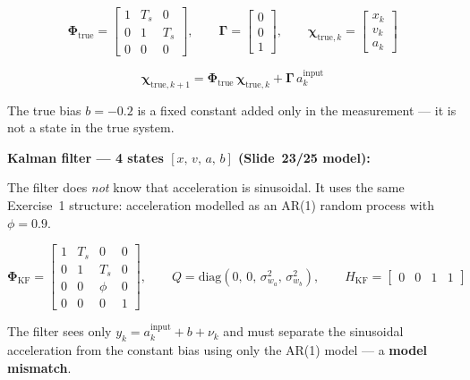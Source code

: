 \documentclass[12pt, a4paper]{article}
\begin{document}
\[
\boldsymbol{\Phi}_{\text{true}} =
\begin{bmatrix} 1 & T_s & 0 \\ 0 & 1 & T_s \\ 0 & 0 & 0 \end{bmatrix},
\qquad
\boldsymbol{\Gamma} = \begin{bmatrix} 0 \\ 0 \\ 1 \end{bmatrix},
\qquad
\boldsymbol{\chi}_{\text{true},k} = \begin{bmatrix} x_k \\ v_k \\ a_k \end{bmatrix}
\]

\[
  \boldsymbol{\chi}_{\text{true},k+1}
  = \boldsymbol{\Phi}_{\text{true}}\,\boldsymbol{\chi}_{\text{true},k}
    + \boldsymbol{\Gamma}\,a_k^{\text{input}}
\]

The true bias $b = -0.2$ is a fixed constant added only in the measurement ---
it is not a state in the true system.

\medskip
\textbf{Kalman filter --- 4 states $[x,\,v,\,a,\,b]$ (Slide~23/25 model):}

The filter does \emph{not} know that acceleration is sinusoidal.
It uses the same Exercise~1 structure: acceleration modelled as an
AR(1) random process with $\phi = 0.9$.

\[
\boldsymbol{\Phi}_{\text{KF}} =
\begin{bmatrix}
  1 & T_s & 0    & 0 \\
  0 &  1  & T_s  & 0 \\
  0 &  0  & \phi & 0 \\
  0 &  0  & 0    & 1
\end{bmatrix},
\qquad
Q = \mathrm{diag}(0,\,0,\,\sigma_{w_a}^2,\,\sigma_{w_b}^2),
\qquad
H_{\text{KF}} = \begin{bmatrix} 0 & 0 & 1 & 1 \end{bmatrix}
\]

The filter sees only $y_k = a_k^{\text{input}} + b + \nu_k$ and must
separate the sinusoidal acceleration from the constant bias using only
the AR(1) model --- a \textbf{model mismatch}.
\end{document}
